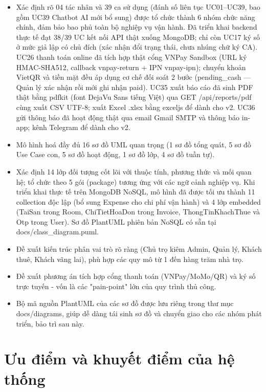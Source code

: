 \documentclass[a4paper,oneside]{report}
\begin{document}
\begin{itemize}
\item
  Xác định rõ 04 tác nhân và 39 ca sử dụng (đánh số liên tục UC01--UC39,
  bao gồm UC39 Chatbot AI mới bổ sung) được tổ chức thành 6 nhóm chức
  năng chính, đảm bảo bao phủ toàn bộ nghiệp vụ vận hành. Đã triển khai
  backend thực tế đạt 38/39 UC kết nối API thật xuống MongoDB; chỉ còn
  UC17 ký số ở mức giả lập có chủ đích (xác nhận đổi trạng thái, chưa
  nhúng chữ ký CA). UC26 thanh toán online đã tích hợp thật cổng VNPay
  Sandbox (URL ký HMAC-SHA512, callback vnpay-return + IPN vnpay-ipn);
  chuyển khoản VietQR và tiền mặt đều áp dụng cơ chế đối soát 2 bước
  (pending\_cash --- Quản lý xác nhận rồi mới ghi nhận paid). UC35 xuất
  báo cáo đã sinh PDF thật bằng pdfkit (font DejaVu Sans tiếng Việt) qua
  GET /api/reports/pdf cùng xuất CSV UTF-8; xuất Excel .xlsx bằng
  exceljs để dành cho v2. UC36 gửi thông báo đã hoạt động thật qua email
  Gmail SMTP và thông báo in-app; kênh Telegram để dành cho v2.
\item
  Mô hình hoá đầy đủ 16 sơ đồ UML quan trọng (1 sơ đồ tổng quát, 5 sơ đồ
  Use Case con, 5 sơ đồ hoạt động, 1 sơ đồ lớp, 4 sơ đồ tuần tự).
\item
  Xác định 14 lớp đối tượng cốt lõi với thuộc tính, phương thức và mối
  quan hệ; tổ chức theo 5 gói (package) tương ứng với các ngữ cảnh
  nghiệp vụ. Khi triển khai thực tế trên MongoDB NoSQL, mô hình đã được
  tối ưu thành 11 collection độc lập (bổ sung Expense cho chi phí vận
  hành) và 4 lớp embedded (TaiSan trong Room, ChiTietHoaDon trong
  Invoice, ThongTinKhachThue và Otp trong User). Sơ đồ PlantUML phiên
  bản NoSQL có sẵn tại docs/class\_diagram.puml.
\item
  Đề xuất kiến trúc phân vai trò rõ ràng (Chủ trọ kiêm Admin, Quản lý,
  Khách thuê, Khách vãng lai), phù hợp các quy mô từ 1 đến hàng trăm nhà
  trọ.
\item
  Đề xuất phương án tích hợp cổng thanh toán (VNPay/MoMo/QR) và ký số
  trực tuyến - vốn là các "pain-point" lớn của quy trình thủ công.
\item
  Bộ mã nguồn PlantUML của các sơ đồ được lưu riêng trong thư mục
  docs/diagrams, giúp dễ dàng tái sinh sơ đồ và chuyển giao cho các nhóm
  phát triển, bảo trì sau này.
\end{itemize}

\section{Ưu điểm và khuyết điểm của hệ thống}
\end{document}
